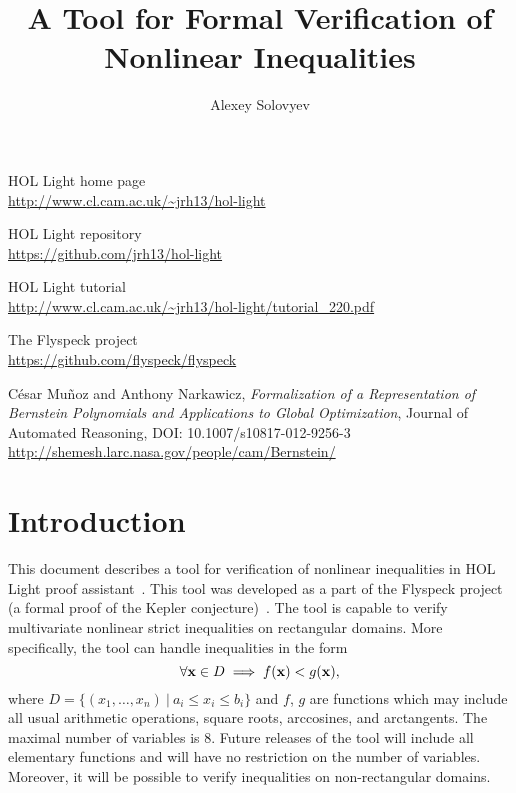 \documentclass[a4paper]{article}
\title{A Tool for Formal Verification of Nonlinear Inequalities}
\author{Alexey Solovyev}
\begin{document}
\maketitle

\tableofcontents

\pagebreak
\begin{thebibliography}{9}
 HOL Light home page\\ 
  \url{http://www.cl.cam.ac.uk/~jrh13/hol-light}

 HOL Light repository\\
  \url{https://github.com/jrh13/hol-light}

 HOL Light tutorial\\
	\url{http://www.cl.cam.ac.uk/~jrh13/hol-light/tutorial_220.pdf}

 The Flyspeck project\\
	\url{https://github.com/flyspeck/flyspeck}

C\'esar Mu\~noz and Anthony Narkawicz, {\it Formalization of a Representation of Bernstein Polynomials and Applications to Global Optimization}, Journal of Automated Reasoning, DOI: 10.1007/s10817-012-9256-3\\
	\url{http://shemesh.larc.nasa.gov/people/cam/Bernstein/}
\end{thebibliography}

\section{Introduction}
This document describes a tool for verification of nonlinear inequalities in HOL Light proof assistant~\cite{HOL, HOL-tutorial}. This tool was developed as a part of the Flyspeck project (a formal proof of the Kepler conjecture)~\cite{flyspeck}. The tool is capable to verify multivariate nonlinear strict inequalities on rectangular domains. More specifically, the tool can handle inequalities in the form
\[\forall {\bf x} \in D \implies f({\bf x}) < g({\bf x}),\]
where $D = \{(x_1, \ldots, x_n)\ |\ a_i \le x_i \le b_i\}$ and $f$, $g$ are functions which may include all usual arithmetic operations, square roots, arccosines, and arctangents. The maximal number of variables is 8. Future releases of the tool will include all elementary functions and will have no restriction on the number of variables. Moreover, it will be possible to verify inequalities on non-rectangular domains.
\end{document}

